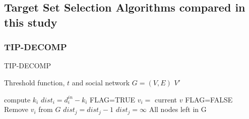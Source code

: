 \subsection{Target Set Selection Algorithms compared in this study}

\subsubsection{TIP-DECOMP}
\begin{algorithm}
	\caption{TIP-DECOMP}
	\begin{algorithmic}[1]
		\Require Threshold function, $t$ and social network $G=(V,E)$
		\Ensure $V'$
		
			\State compute $k_{i}$ 
		\EndFor
			\State $dist_{i}=d_{i}^{in}-k_{i} $
		\EndFor
		\State FLAG=TRUE 
					\State $v_{i}=$ current $v$
				\EndIf
			\EndFor
				\State FLAG=FALSE 
			\Else
			\State Remove $v_{i}$ from $G$ 
						\State $dist_{j}=dist_{j}-1$
					\Else
						\State$dist_{j}=\infty$  
					\EndIf
				\EndFor
			\EndIf
		\EndWhile
		\State \Return All nodes left in G 
	\end{algorithmic}
\end{algorithm}


